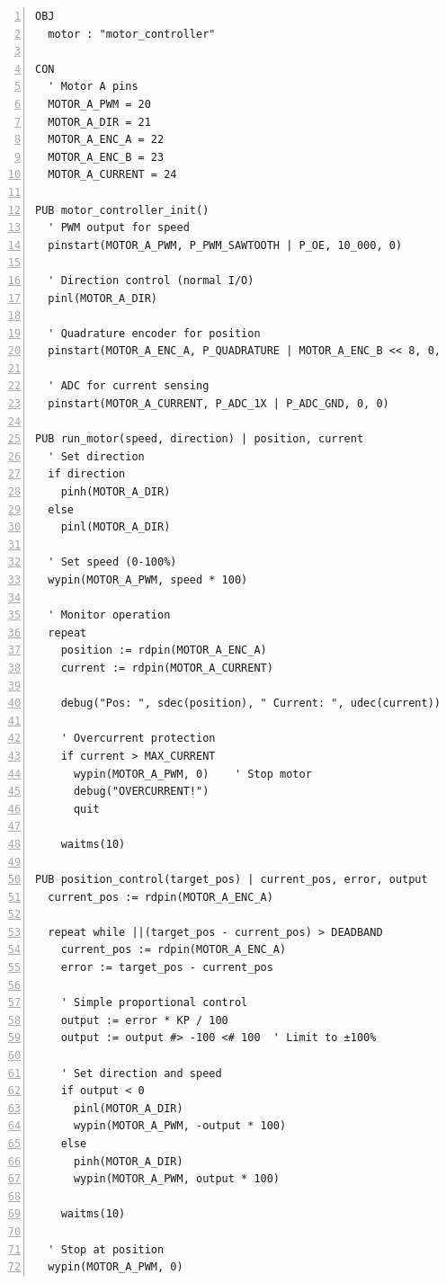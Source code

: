 \documentclass[11pt,a4paper,oneside,english]{book}
\begin{document}
\begin{Spin2Block}
\begin{Verbatim}[numbers=left,numbersep=5pt,xleftmargin=15pt]
OBJ
  motor : "motor_controller"
  
CON
  ' Motor A pins
  MOTOR_A_PWM = 20
  MOTOR_A_DIR = 21
  MOTOR_A_ENC_A = 22
  MOTOR_A_ENC_B = 23
  MOTOR_A_CURRENT = 24
  
PUB motor_controller_init()
  ' PWM output for speed
  pinstart(MOTOR_A_PWM, P_PWM_SAWTOOTH | P_OE, 10_000, 0)
  
  ' Direction control (normal I/O)
  pinl(MOTOR_A_DIR)
  
  ' Quadrature encoder for position
  pinstart(MOTOR_A_ENC_A, P_QUADRATURE | MOTOR_A_ENC_B << 8, 0, 0)
  
  ' ADC for current sensing
  pinstart(MOTOR_A_CURRENT, P_ADC_1X | P_ADC_GND, 0, 0)

PUB run_motor(speed, direction) | position, current
  ' Set direction
  if direction
    pinh(MOTOR_A_DIR)
  else
    pinl(MOTOR_A_DIR)
    
  ' Set speed (0-100%)
  wypin(MOTOR_A_PWM, speed * 100)
  
  ' Monitor operation
  repeat
    position := rdpin(MOTOR_A_ENC_A)
    current := rdpin(MOTOR_A_CURRENT)
    
    debug("Pos: ", sdec(position), " Current: ", udec(current))
    
    ' Overcurrent protection
    if current > MAX_CURRENT
      wypin(MOTOR_A_PWM, 0)    ' Stop motor
      debug("OVERCURRENT!")
      quit
      
    waitms(10)

PUB position_control(target_pos) | current_pos, error, output
  current_pos := rdpin(MOTOR_A_ENC_A)
  
  repeat while ||(target_pos - current_pos) > DEADBAND
    current_pos := rdpin(MOTOR_A_ENC_A)
    error := target_pos - current_pos
    
    ' Simple proportional control
    output := error * KP / 100
    output := output #> -100 <# 100  ' Limit to ±100%
    
    ' Set direction and speed
    if output < 0
      pinl(MOTOR_A_DIR)
      wypin(MOTOR_A_PWM, -output * 100)
    else
      pinh(MOTOR_A_DIR)
      wypin(MOTOR_A_PWM, output * 100)
      
    waitms(10)
  
  ' Stop at position
  wypin(MOTOR_A_PWM, 0)
\end{Verbatim}
\end{Spin2Block}
\end{document}
